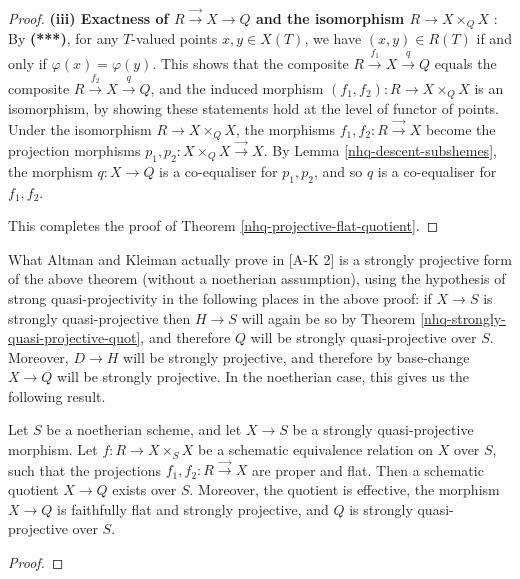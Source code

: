 \begin{proof}
\textbf{(iii) Exactness of $R \stackrel{\to}{\scriptstyle\to} X \to Q$
and the isomorphism $R \to X\times_QX$ }:
By \textbf{(***)}, for any $T$-valued points $x,y \in X(T)$, we have
$(x,y)\in R(T)$ if and only if $\varphi(x) = \varphi(y)$.
This shows that the composite $R \stackrel{f_1}{\to} X \stackrel{q}{\to} Q$
equals the composite $R \stackrel{f_2}{\to} X \stackrel{q}{\to} Q$, and
the induced morphism $(f_1,f_2) : R \to X\times_QX$
is an isomorphism, by showing these statements
hold at the level of functor of points. Under the isomorphism
$R \to X\times_QX$, the
morphisms $f_1,f_2 : R  \stackrel{\to}{\scriptstyle\to} X$
become the projection morphisms $p_1,p_2 : X\times_QX
\stackrel{\to}{\scriptstyle\to} X$.
By Lemma \ref{nhq-descent-subshemes}, the
morphism $q: X \to Q$ is a co-equaliser for $p_1,p_2$, and so $q$
is a co-equaliser for $f_1,f_2$.

This completes the proof of Theorem \ref{nhq-projective-flat-quotient}.\end{proof}



What Altman and Kleiman actually prove in [A-K 2] is
a strongly projective form of the above theorem
(without a noetherian assumption),
using the hypothesis of strong quasi-projectivity
in the following places in the above proof: if $X\to S$ is
strongly quasi-projective then $H \to S$ will again be so
by Theorem \ref{nhq-strongly-quasi-projective-quot}, and therefore
$Q$ will be strongly quasi-projective over $S$. Moreover, $D\to H$
will be strongly projective, and therefore by base-change
$X\to Q$ will be strongly projective.
In the noetherian case, this gives us the following result.



\begin{theorem}\label{nhq-strongly-projective-quotient}
Let $S$ be a noetherian scheme, and let
$X\to S$ be a strongly quasi-projective morphism.
Let $f : R \to X\times_SX$ be a schematic
equivalence relation on $X$ over $S$, such that
the projections $f_1,f_2 : R \stackrel{\to}{\scriptstyle\to} X$
are proper and flat.
Then a schematic quotient $X\to Q$ exists over $S$.
Moreover, the quotient is effective,
the morphism $X \to Q$ is
faithfully flat and strongly projective, and $Q$ is strongly
quasi-projective over $S$.
\end{theorem}

\begin{proof}
\notready
\end{proof}














\bigskip
\bigskip

